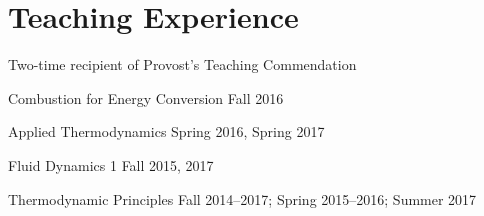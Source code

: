 \section{{\sectionfont Teaching Experience}}


\vspace{0.25\baselineskip}


Two-time recipient of Provost's Teaching Commendation
\begin{outerlist}
\item Combustion for Energy Conversion \hfill Fall 2016
\item Applied Thermodynamics \hfill Spring 2016, Spring 2017

\item Fluid Dynamics 1 \hfill Fall 2015, 2017

\item Thermodynamic Principles \hfill Fall 2014--2017; Spring 2015--2016; Summer 2017


\end{outerlist}
